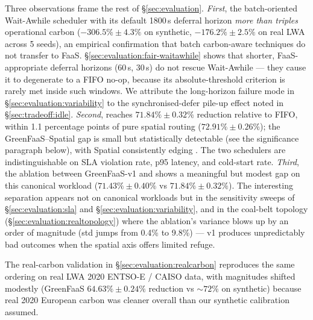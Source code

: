 Three observations frame the rest of \S\ref{sec:evaluation}.
\emph{First}, the batch-oriented Wait-Awhile scheduler with its
default 1800\,s deferral horizon \emph{more than triples} operational
carbon ($-306.5\% \pm 4.3\%$ on synthetic, $-176.2\% \pm 2.5\%$ on
real LWA across 5 seeds), an
empirical confirmation that batch carbon-aware techniques do not
transfer to FaaS. \S\ref{sec:evaluation:fair-waitawhile} shows that
shorter, FaaS-appropriate deferral horizons (60\,s, 30\,s) do not
rescue Wait-Awhile --- they cause it to degenerate to a FIFO no-op,
because its absolute-threshold criterion is rarely met inside such
windows. We attribute the long-horizon failure mode in
\S\ref{sec:evaluation:variability} to the synchronised-defer pile-up
effect noted in \S\ref{sec:tradeoff:idle}. \emph{Second},
\GreenFaaS{} reaches $71.84\% \pm 0.32\%$ reduction relative to FIFO,
within 1.1 percentage points of pure spatial routing
($72.91\% \pm 0.26\%$); the GreenFaaS--Spatial gap is small but
statistically detectable (see the significance paragraph below),
with Spatial consistently edging \GreenFaaS{}. The two schedulers
are indistinguishable on SLA violation rate, p95 latency, and
cold-start rate. \emph{Third}, the ablation between GreenFaaS-v1 and
\GreenFaaS{} shows a meaningful but modest gap on this canonical
workload ($71.43\% \pm 0.40\%$ vs $71.84\% \pm 0.32\%$). The
interesting separation appears not on canonical
workloads but in the sensitivity sweeps of
\S\ref{sec:evaluation:sla} and \S\ref{sec:evaluation:variability},
and in the coal-belt topology
(\S\ref{sec:evaluation:realtopology}) where the ablation's variance
blows up by an order of magnitude (std jumps from 0.4\% to 9.8\%) ---
v1 produces unpredictably bad outcomes when the spatial axis offers
limited refuge.

The real-carbon validation in \S\ref{sec:evaluation:realcarbon}
reproduces the same ordering on real LWA 2020 ENTSO-E / CAISO data,
with magnitudes shifted modestly (GreenFaaS $64.63\% \pm 0.24\%$
reduction vs $\sim 72\%$ on synthetic) because real 2020 European
carbon was cleaner overall than our synthetic calibration assumed.

